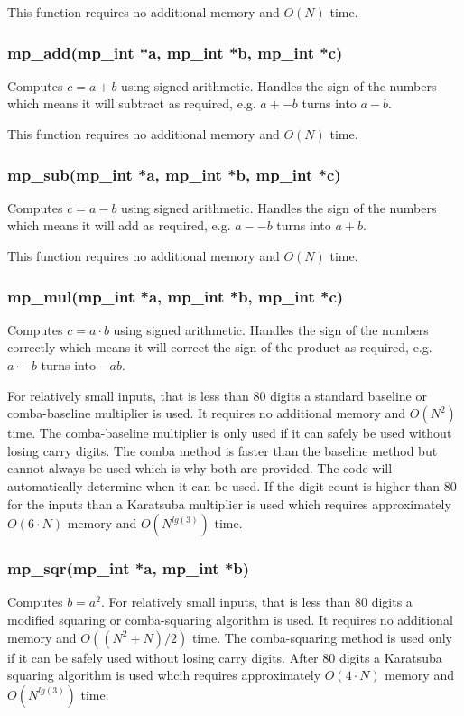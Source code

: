 \documentclass{article}
\begin{document}
This function requires no additional memory and $O(N)$ time.

\subsubsection{mp\_add(mp\_int *a, mp\_int *b, mp\_int *c)}
Computes $c = a + b$ using signed arithmetic.  Handles the sign of the numbers which means it will subtract as 
required, e.g. $a + -b$ turns into $a - b$.

This function requires no additional memory and $O(N)$ time.

\subsubsection{mp\_sub(mp\_int *a, mp\_int *b, mp\_int *c)}
Computes $c = a - b$ using signed arithmetic.   Handles the sign of the numbers which means it will add as 
required, e.g. $a - -b$ turns into $a + b$.

This function requires no additional memory and $O(N)$ time.

\subsubsection{mp\_mul(mp\_int *a, mp\_int *b, mp\_int *c)}
Computes $c = a \cdot b$ using signed arithmetic.  Handles the sign of the numbers correctly which means it will 
correct the sign of the product as required, e.g. $a \cdot -b$ turns into $-ab$.

For relatively small inputs, that is less than 80 digits a standard baseline or comba-baseline multiplier is used.  It
requires no additional memory and $O(N^2)$ time.  The comba-baseline multiplier is only used if it can safely be used
without losing carry digits.  The comba method is faster than the baseline method but cannot always be used which is why
both are provided.  The code will automatically determine when it can be used.  If the digit count is higher
than 80 for the inputs than a Karatsuba multiplier is used which requires approximately $O(6 \cdot N)$ memory and 
$O(N^{lg(3)})$ time.  

\subsubsection{mp\_sqr(mp\_int *a, mp\_int *b)}
Computes $b = a^2$. 
For relatively small inputs, that is less than 80 digits a modified squaring or comba-squaring algorithm is used.  It
requires no additional memory and $O((N^2 + N)/2)$ time.  The comba-squaring method is used only if it can be safely used
without losing carry digits.  After 80 digits a Karatsuba squaring algorithm is used whcih requires approximately 
$O(4 \cdot N)$ memory and $O(N^{lg(3)})$ time.
\end{document}
